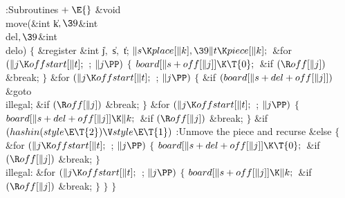 \Y\B\4:Subroutines\X${}\mathrel+\E{}$\6
\&{void} \\{move}(\&{int} \|k${},\39{}$\&{int} \\{del}${},\39{}$\&{int} %
\\{delo})\1\1\2\2\6
${}\{{}$\1\6
\&{register} \&{int} \|j${},{}$ \|s${},{}$ \|t;\7
${}\|s\K\\{place}[\|k],\39\|t\K\\{piece}[\|k];{}$\6
\&{for} ${}(\|j\K\\{offstart}[\|t];{}$  ; ${}\|j\PP){}$\5
${}\{{}$\1\6
${}\\{board}[\|s+\\{off}[\|j]]\K\T{0};{}$\6
\&{if} ${}(\R\\{off}[\|j]){}$\1\5
\&{break};\2\6
\4${}\}{}$\2\6
\&{for} ${}(\|j\K\\{offstart}[\|t];{}$  ; ${}\|j\PP){}$\5
${}\{{}$\1\6
\&{if} ${}(\\{board}[\|s+\\{del}+\\{off}[\|j]]){}$\1\5
\&{goto} \\{illegal};\2\6
\&{if} ${}(\R\\{off}[\|j]){}$\1\5
\&{break};\2\6
\4${}\}{}$\2\6
\&{for} ${}(\|j\K\\{offstart}[\|t];{}$  ; ${}\|j\PP){}$\5
${}\{{}$\1\6
${}\\{board}[\|s+\\{del}+\\{off}[\|j]]\K\|k;{}$\6
\&{if} ${}(\R\\{off}[\|j]){}$\1\5
\&{break};\2\6
\4${}\}{}$\2\6
\&{if} ${}(\\{hashin}(\\{style}\E\T{2})\V\\{style}\E\T{1}){}$\1\5
:Unmove the piece and recurse\X\2\6
\&{else}\5
${}\{{}$\1\6
\&{for} ${}(\|j\K\\{offstart}[\|t];{}$  ; ${}\|j\PP){}$\5
${}\{{}$\1\6
${}\\{board}[\|s+\\{del}+\\{off}[\|j]]\K\T{0};{}$\6
\&{if} ${}(\R\\{off}[\|j]){}$\1\5
\&{break};\2\6
\4${}\}{}$\2\6
\4\\{illegal}:\6
\&{for} ${}(\|j\K\\{offstart}[\|t];{}$  ; ${}\|j\PP){}$\5
${}\{{}$\1\6
${}\\{board}[\|s+\\{off}[\|j]]\K\|k;{}$\6
\&{if} ${}(\R\\{off}[\|j]){}$\1\5
\&{break};\2\6
\4${}\}{}$\2\6
\4${}\}{}$\2\6
\4${}\}{}$\2\par
\fi

